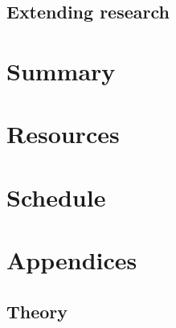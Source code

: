 \documentclass[12pt]{article}
\begin{document}
\subsection{Extending research}


\section{Summary}


\section{Resources}


\section{Schedule}


\appendix
\section*{Appendices}
\renewcommand{\thesubsection}{\Alph{subsection}}

\subsection{Theory} \label{appendix:theory}

 

\end{document}
